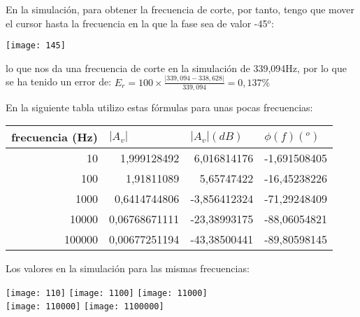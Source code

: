 \documentclass{article}
\begin{document}
En la simulación, para obtener la frecuencia de corte, por tanto, tengo que mover el cursor hasta la frecuencia en la que la fase sea de valor -45$^o$:

\begin{center}
\texttt{[image: 145]}
\end{center}

lo que nos da una frecuencia de corte en la simulación de 339,094Hz, por lo que se ha tenido un error de:
$E_r=100\times\frac{|339,094-338,628|}{339,094}=0,137\%$

\cleardoublepage
En la siguiente tabla utilizo estas fórmulas para unas pocas frecuencias:

\begin{table}[h]
\centering
\begin{tabular}{|r|r|r|r|}
\hline
\multicolumn{1}{|l|}{frecuencia (Hz)} & \multicolumn{1}{l|}{$|A_v|$} & \multicolumn{1}{l|}{$|A_v|(dB)$} & \multicolumn{1}{l|}{$\phi (f) (^o)$} \\ \hline
10                                    & 1,999128492                                       & 6,016814176                      & -1,691508405                         \\ \hline
100                                   & 1,91811089                                        & 5,65747422                       & -16,45238226                         \\ \hline
1000                                  & 0,6414744806                                      & -3,856412324                     & -71,29248409                         \\ \hline
10000                                 & 0,06768671111                                     & -23,38993175                     & -88,06054821                         \\ \hline
100000                                & 0,00677251194                                     & -43,38500441                     & -89,80598145                         \\ \hline
\end{tabular}
\end{table}


Los valores en la simulación para las mismas frecuencias:
\begin{center}
\texttt{[image: 110]}
\texttt{[image: 1100]}
\texttt{[image: 11000]}\\
\texttt{[image: 110000]}
\texttt{[image: 1100000]}
\end{center}
\end{document}

